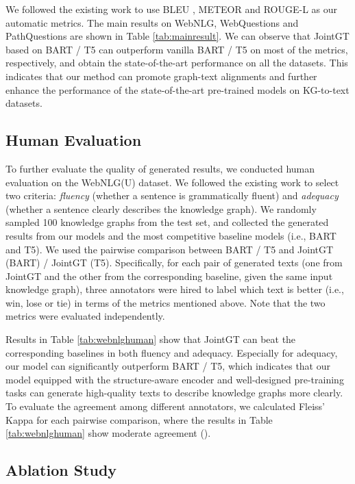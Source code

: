 \documentclass[11pt,a4paper]{article}
\begin{document}
We followed the existing work \cite{shimorina2018webnlgv2,chen2020bignn} to use BLEU \cite{papineni2002bleu}, METEOR \cite{banerjee2005meteor} and ROUGE-L \cite{lin2004rouge} as our automatic metrics. The main results on WebNLG, WebQuestions and PathQuestions are shown in Table \ref{tab:mainresult}. We can observe that JointGT based on BART / T5 can outperform vanilla BART / T5 on most of the metrics, respectively, and obtain the state-of-the-art performance on all the datasets. This indicates that our method can promote graph-text alignments and further enhance the performance of the state-of-the-art pre-trained models on KG-to-text datasets.


\subsection{Human Evaluation}

To further evaluate the quality of generated results, we conducted human evaluation on the WebNLG(U) dataset. We followed the existing work \cite{ferreira2019comparison,ribeiro2020globallocal} to select two criteria: \textit{fluency} (whether a sentence is grammatically fluent) and \textit{adequacy} (whether a sentence clearly describes the knowledge graph). We randomly sampled 100 knowledge graphs from the test set, and collected the generated results from our models and the most competitive baseline models (i.e., BART and T5). We used the pairwise comparison between BART / T5 and JointGT (BART) / JointGT (T5). Specifically, for each pair of generated texts (one from JointGT and the other from the corresponding baseline, given the same input knowledge graph), three annotators were hired to label which text is better (i.e., win, lose or tie) in terms of the metrics mentioned above. Note that the two metrics were evaluated independently.

Results in Table \ref{tab:webnlghuman} show that JointGT can beat the corresponding baselines in both fluency and adequacy. Especially for adequacy, our model can significantly outperform BART / T5, which indicates that our model equipped with the structure-aware encoder and well-designed pre-training tasks can generate high-quality texts to describe knowledge graphs more clearly. To evaluate the agreement among different annotators, we calculated Fleiss' Kappa \cite{fleiss1971kappa} for each pairwise comparison, where the results in Table \ref{tab:webnlghuman} show moderate agreement ().


\subsection{Ablation Study}
\end{document}
